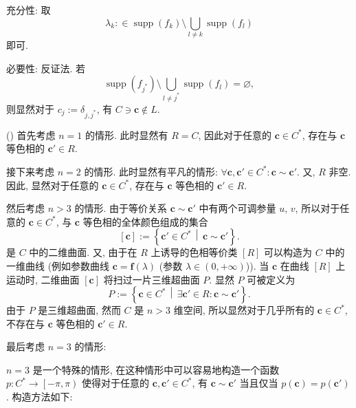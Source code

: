 \documentclass{article}
\newcounter{para}
\newcommand\mypara{\par\refstepcounter{para}(\thepara)\space}
\begin{document}
充分性:
取
\begin{equation}
	\lambda_k:\in\operatorname{supp}\!\left(f_k\right)\setminus
	\bigcup_{l\ne k}\operatorname{supp}\!\left(f_l\right)
\end{equation}
即可.

必要性:
反证法.
若
\begin{equation}
	\operatorname{supp}\!\left(f_{j^*}\right)\setminus
	\bigcup_{l\ne j^*}\operatorname{supp}\!\left(f_l\right)=\varnothing,
\end{equation}
则显然对于 $c_j:=\delta_{j,j^*}$, 有 $C\ni\mathbf c\notin L$.

\mypara
首先考虑 $n=1$ 的情形.
此时显然有 $R=C$, 因此对于任意的 $\mathbf c\in C^*$,
存在与 $\mathbf c$ 等色相的 $\mathbf c'\in R$.

接下来考虑 $n=2$ 的情形.
此时显然有平凡的情形:
$\forall\mathbf c,\mathbf c'\in C^*:\mathbf c\sim\mathbf c'$.
又, $R$ 非空.
因此, 显然对于任意的 $\mathbf c\in C^*$,
存在与 $\mathbf c$ 等色相的 $\mathbf c'\in R$.

然后考虑 $n>3$ 的情形.
由于等价关系 $\mathbf c\sim\mathbf c'$ 中有两个可调参量 $u$, $v$,
所以对于任意的 $\mathbf c\in C^*$,
与 $\mathbf c$ 等色相的全体颜色组成的集合
\begin{equation}
	\left[\mathbf c\right]:=\left\{\mathbf c'\in C^*\,\middle|\,
	\mathbf c\sim\mathbf c'\right\}.
\end{equation}
是 $C$ 中的二维曲面.
又, 由于在 $R$ 上诱导的色相等价类 $\left[R\right]$
可以构造为 $C$ 中的一维曲线
(例如参数曲线 $\mathbf c=\mathbf f\!\left(\lambda\right)$
(参数 $\lambda\in\left(0,+\infty\right)$)).
当 $\mathbf c$ 在曲线 $\left[R\right]$ 上运动时,
二维曲面 $\left[\mathbf c\right]$ 将扫过一片三维超曲面 $P$.
显然 $P$ 可被定义为
\begin{equation}
	P:=\left\{\mathbf c\in C^*\,\middle|\,
	\exists\mathbf c'\in R:\mathbf c\sim\mathbf c'\right\}.
\end{equation}
由于 $P$ 是三维超曲面, 然而 $C$ 是 $n>3$ 维空间,
所以显然对于几乎所有的 $\mathbf c\in C^*$,
不存在与 $\mathbf c$ 等色相的 $\mathbf c'\in R$.

最后考虑 $n=3$ 的情形:

$n=3$ 是一个特殊的情形, 在这种情形中可以容易地构造一个函数
$p:C^*\to\left[-\pi,\pi\right)$
使得对于任意的 $\mathbf c,\mathbf c'\in C^*$,
有 $\mathbf c\sim\mathbf c'$ 当且仅当
$p\!\left(\mathbf c\right)=p\!\left(\mathbf c'\right)$.
构造方法如下:
\end{document}
